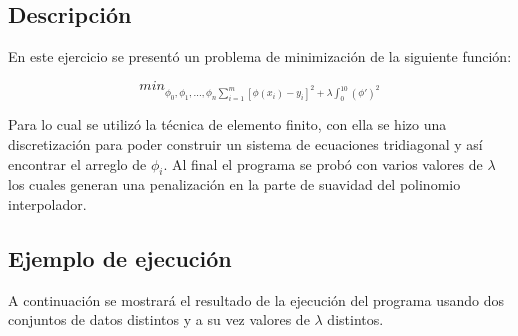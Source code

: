 \documentclass[12pt]{article}
\begin{document}
\subsection{Descripción}
En este ejercicio se presentó un problema de minimización de la siguiente función:

$$min_{\phi_0,\phi_1,...,\phi_n \sum_{i=1}^{m}[\phi(x_i)-y_i]^2+\lambda \int_{0}^{10}(\phi')^2}$$

Para lo cual se utilizó la técnica de elemento finito, con ella se hizo una discretización para poder construir un sistema de ecuaciones tridiagonal y así encontrar el arreglo de $\phi_i$. Al final el programa se probó con varios valores de $\lambda$ los cuales generan una penalización en la parte de suavidad del polinomio interpolador.

\subsection{Ejemplo de ejecución}
A continuación se mostrará el resultado de la ejecución del programa usando dos conjuntos de datos distintos y a su vez valores de $\lambda$ distintos.

\begin{figure}[H]
	\centering
	\hfill
\end{figure}
\end{document}
